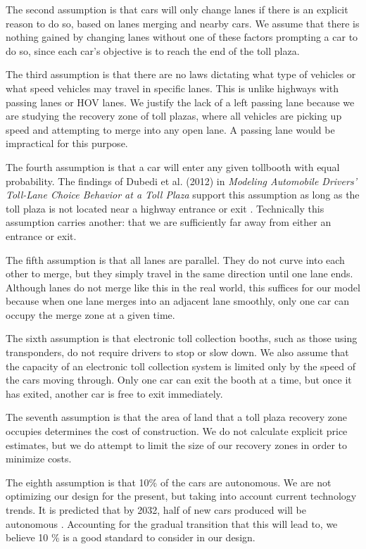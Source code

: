 \documentclass[a4paper, 11pt]{article}
\begin{document}
The second assumption is that cars will only change lanes if there is an explicit reason to do so, based on lanes merging and nearby cars. We assume that there is nothing gained by changing lanes without one of these factors prompting a car to do so, since each car's objective is to reach the end of the toll plaza. 

The third assumption is that there are no laws dictating what type of vehicles or what speed vehicles may travel in specific lanes. This is unlike highways with passing lanes or HOV lanes. We justify the lack of a left passing lane because we are studying the recovery zone of toll plazas, where all vehicles are picking up speed and attempting to merge into any open lane. A passing lane would be impractical for this purpose. 

The fourth assumption is that a car will enter any given tollbooth with equal probability. The findings of Dubedi et al. (2012) in \textit{Modeling Automobile Drivers' Toll-Lane Choice Behavior at a Toll Plaza} support this assumption as long as the toll plaza is not located near a highway entrance or exit \cite{LaneChoice}. Technically this assumption carries another: that we are sufficiently far away from either an entrance or exit. 

The fifth assumption is that all lanes are parallel. They do not curve into each other to merge, but they simply travel in the same direction until one lane ends. Although lanes do not merge like this in the real world, this suffices for our model because when one lane merges into an adjacent lane smoothly, only one car can occupy the merge zone at a given time. 

The sixth assumption is that electronic toll collection booths, such as those using transponders, do not require drivers to stop or slow down. We also assume that the capacity of an electronic toll collection system is limited only by the speed of the cars moving through. Only one car can exit the booth at a time, but once it has exited, another car is free to exit immediately. 

The seventh assumption is that the area of land that a toll plaza recovery zone occupies determines the cost of construction. We do not calculate explicit price estimates, but we do attempt to limit the size of our recovery zones in order to minimize costs. 

The eighth assumption is that 10\% of the cars are autonomous. We are not optimizing our design for the present, but taking into account current technology trends. It is predicted that by 2032, half of new cars produced will be autonomous \cite{autonomous_cars}. Accounting for the gradual transition that this will lead to, we believe 10 \% is a good standard to consider in our design. 
\end{document}
